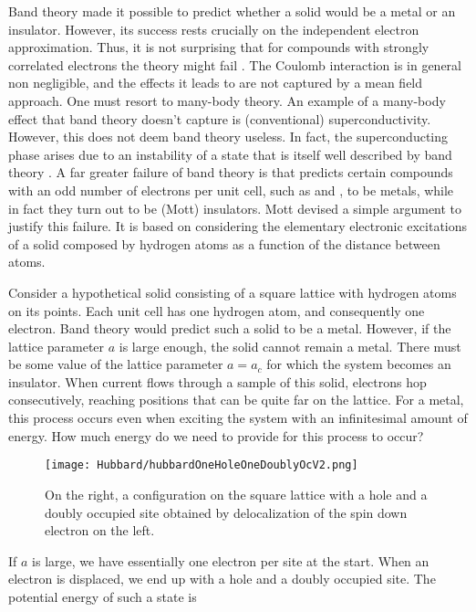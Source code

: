 Band theory made it possible to predict whether a solid would be a metal or an insulator.
However, its success rests crucially on the independent electron approximation.
Thus, it is not surprising that for compounds with strongly correlated electrons the theory might fail \cite{mila_physique_2007}.
The Coulomb interaction is in general non negligible, and the effects it leads to are not captured by a mean field approach.
One must resort to many-body theory.
An example of a many-body effect that band theory doesn't capture is (conventional) superconductivity.
However, this does not deem band theory useless.
In fact, the superconducting phase arises due to an instability of a state that is itself well described by band theory \cite{gennes_superconductivity_1999}.
A far greater failure of band theory is that predicts certain compounds with an odd number of electrons per unit cell, such as  and ,  to be metals, while in fact  they turn out to be (Mott) insulators.
Mott devised a simple argument to justify this failure.
It is based on considering the elementary electronic excitations of a solid composed by hydrogen atoms as a function of the distance between atoms.

Consider a hypothetical solid consisting of a square lattice with hydrogen atoms on its points.
Each unit cell has one hydrogen atom, and consequently one electron.
Band theory would predict such a solid to be a metal.
However, if the lattice parameter $a$ is large enough, the solid cannot remain a metal.
There must be some value of the lattice parameter $a = a_c$ for which the system becomes an insulator.
When current flows through a sample of this solid, electrons hop consecutively, reaching positions that can be quite far on the lattice.
For a metal, this process occurs even when exciting the system with an infinitesimal amount of energy.
How much energy do we need to provide for this process to occur?

\begin{figure}[ht!]\label{hubbardOneHoleOneDoublyOc}
\centering
\texttt{[image: Hubbard/hubbardOneHoleOneDoublyOcV2.png]}
\caption[Configuration of the Hubbard model on the square lattice with a hole and a doubly occupied site.]{On the right, a configuration on the square lattice with a hole and a doubly occupied site obtained by delocalization of the spin down electron on the left.}
\end{figure}

If $a$ is large, we have essentially one electron per site at the start.
When an electron is displaced, we end up with a hole and a doubly occupied site.
The potential energy of such a state is

